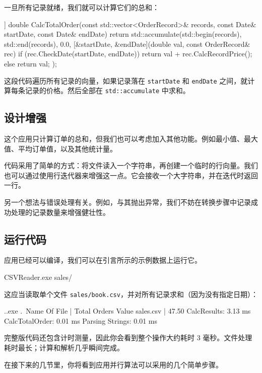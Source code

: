 一旦所有记录就绪，我们就可以计算它们的总和：

\begin{codebox}[cpp]
[[nodiscard]] double CalcTotalOrder(const std::vector<OrderRecord>& records,
const Date& startDate, const Date& endDate)
{
return std::accumulate(std::begin(records), std::end(records), 0.0,
[&startDate, &endDate](double val, const OrderRecord& rec) {
if (rec.CheckDate(startDate, endDate))
return val + rec.CalcRecordPrice();
else
return val;
}
);
}
\end{codebox}

这段代码遍历所有记录的向量，如果记录落在 \texttt{startDate} 和 \texttt{endDate} 之间，就计算每条记录的价格。然后全部在 \texttt{std::accumulate} 中求和。

\subsection{设计增强}

这个应用只计算订单的总和，但我们也可以考虑加入其他功能。例如最小值、最大值、平均订单值，以及其他统计量。

代码采用了简单的方式：将文件读入一个字符串，再创建一个临时的行向量。我们也可以通过使用行迭代器来增强这一点。它会接收一个大字符串，并在迭代时返回一行。

另一个想法与错误处理有关。例如，与其抛出异常，我们不妨在转换步骤中记录成功处理的记录数量来增强健壮性。

\subsection{运行代码}

应用已经可以编译，我们可以在引言所示的示例数据上运行它。

\begin{codebox}[cpp]
CSVReader.exe sales/
\end{codebox}

这应当读取单个文件 \texttt{sales/book.csv}，并对所有记录求和（因为没有指定日期）：

\begin{codebox}[cpp]
.\CalcOrdersSerial.exe .\sales\
Name Of File
| Total Orders Value
sales\book.csv
| 47.50
CalcResults: 3.13 ms
CalcTotalOrder: 0.01 ms
Parsing Strings: 0.01 ms
\end{codebox}

完整版代码还包含计时测量，因此你会看到整个操作大约耗时 3 毫秒。文件处理耗时最长；计算和解析几乎瞬间完成。

在接下来的几节里，你将看到应用并行算法可以采用的几个简单步骤。

